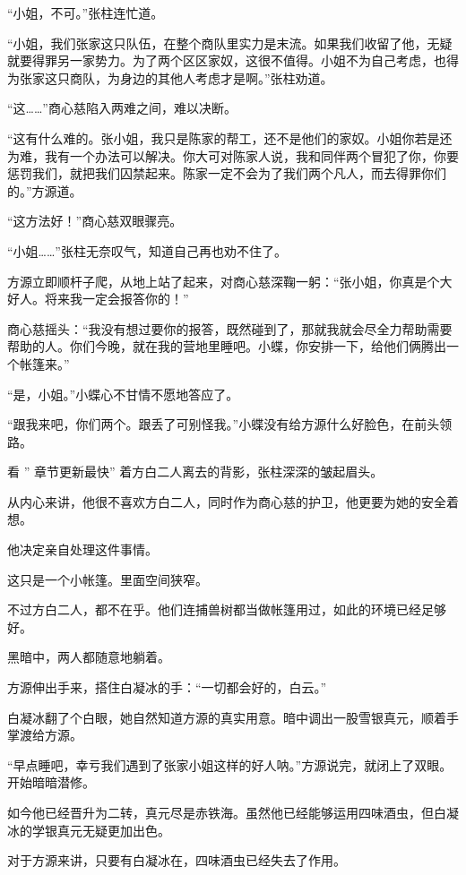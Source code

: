 
\begin{this_body}

“小姐，不可。”张柱连忙道。

“小姐，我们张家这只队伍，在整个商队里实力是末流。如果我们收留了他，无疑就要得罪另一家势力。为了两个区区家奴，这很不值得。小姐不为自己考虑，也得为张家这只商队，为身边的其他人考虑才是啊。”张柱劝道。

“这……”商心慈陷入两难之间，难以决断。

“这有什么难的。张小姐，我只是陈家的帮工，还不是他们的家奴。小姐你若是还为难，我有一个办法可以解决。你大可对陈家人说，我和同伴两个冒犯了你，你要惩罚我们，就把我们囚禁起来。陈家一定不会为了我们两个凡人，而去得罪你们的。”方源道。

“这方法好！”商心慈双眼骤亮。

“小姐……”张柱无奈叹气，知道自己再也劝不住了。

方源立即顺杆子爬，从地上站了起来，对商心慈深鞠一躬：“张小姐，你真是个大好人。将来我一定会报答你的！”

商心慈摇头：“我没有想过要你的报答，既然碰到了，那就我就会尽全力帮助需要帮助的人。你们今晚，就在我的营地里睡吧。小蝶，你安排一下，给他们俩腾出一个帐篷来。”

“是，小姐。”小蝶心不甘情不愿地答应了。

“跟我来吧，你们两个。跟丢了可别怪我。”小蝶没有给方源什么好脸色，在前头领路。

看 ” 章节更新最快” 着方白二人离去的背影，张柱深深的皱起眉头。

从内心来讲，他很不喜欢方白二人，同时作为商心慈的护卫，他更要为她的安全着想。

他决定亲自处理这件事情。

这只是一个小帐篷。里面空间狭窄。

不过方白二人，都不在乎。他们连捕兽树都当做帐篷用过，如此的环境已经足够好。

黑暗中，两人都随意地躺着。

方源伸出手来，搭住白凝冰的手：“一切都会好的，白云。”

白凝冰翻了个白眼，她自然知道方源的真实用意。暗中调出一股雪银真元，顺着手掌渡给方源。

“早点睡吧，幸亏我们遇到了张家小姐这样的好人呐。”方源说完，就闭上了双眼。开始暗暗潜修。

如今他已经晋升为二转，真元尽是赤铁海。虽然他已经能够运用四味酒虫，但白凝冰的学银真元无疑更加出色。

对于方源来讲，只要有白凝冰在，四味酒虫已经失去了作用。


\end{this_body}

